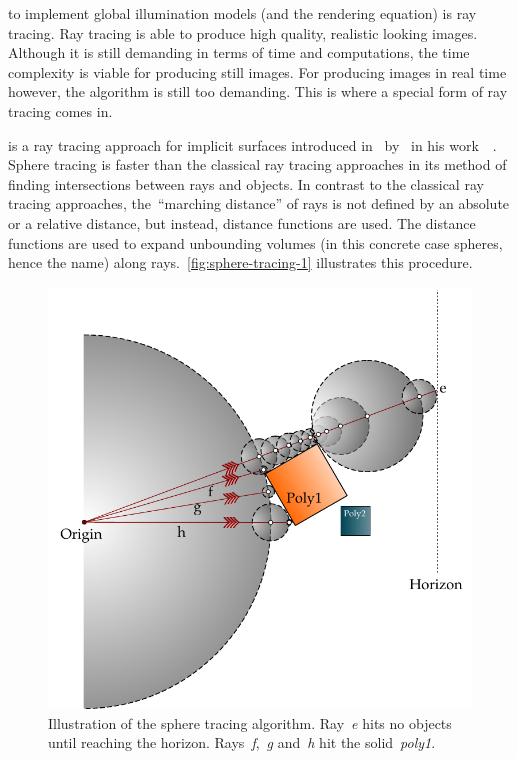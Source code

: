 \documentclass[%
    a4paper,    %
    justified,  %
    nobib,      %
    openany     %
]{tufte-book}
\makeatletter
\renewcommand{\label}[1]{\@tufte@label{##1}}%
\makeatother
\begin{document}
 to implement global illumination models (and
the rendering equation) is ray tracing. Ray tracing is able to produce high
quality, realistic looking images. Although it is still demanding in terms of
time and computations, the time complexity is viable for producing still
images. For producing images in real time however, the algorithm is still too
demanding. This is where a special form of ray tracing comes in.

 is a ray tracing approach for implicit surfaces
introduced in~\citeyear{hart_sphere_1994} by~ in
his work~~\cite{hart_sphere_1994}. 
Sphere tracing is faster than the classical ray tracing approaches in its method
of finding
intersections between rays and objects. In contrast to the classical ray tracing
approaches, the~\enquote{marching distance} of rays is not defined by an absolute or a
relative distance, but instead, distance functions are used. The distance functions
are used to expand unbounding volumes (in this concrete case spheres, hence the
name) along rays.~\autoref{fig:sphere-tracing-1} illustrates this procedure.

\begin{figure}[h]
  \centering
  \includegraphics[width=0.75\linewidth]{images/sphere-tracing-principle}
  \caption{Illustration of the sphere tracing
    algorithm.
    Ray~\textit{e} hits no objects until reaching the horizon.
    Rays~\textit{f},~\textit{g} and~\textit{h} hit
    the solid~\textit{poly1}.}
\label{fig:sphere-tracing-1}
\end{figure}
\end{document}
